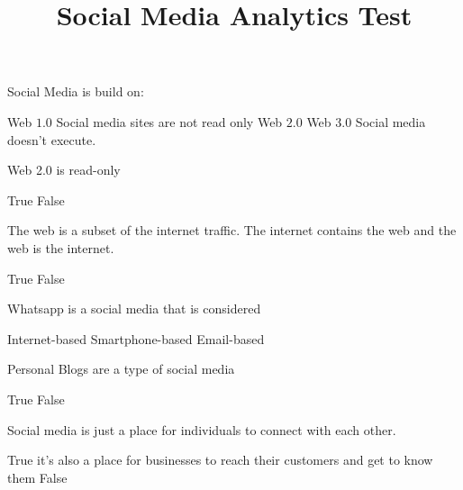 \documentclass[theme=sleek, randomorder, hidesidemenu]{webquiz}
\title{Social Media Analytics Test}
\begin{document}
\begin{question}
  Social Media is build on:
  \begin{choice}[columns=2]
    \incorrect Web $1.0$ %
    \feedback Social media sites are not read only
    \correct Web $2.0$ %
    \incorrect Web $3.0$ %
    \feedback Social media doesn't execute.
  \end{choice}
\end{question}

\begin{question}
  Web 2.0 is read-only
  \begin{choice}[columns=2]
    \incorrect True
    \correct False
  \end{choice}
\end{question}

\begin{question}
  The web is a subset of the internet traffic. The internet contains the web and the web is the internet.
  \begin{choice}[columns=2]
    \incorrect True
    \correct False
  \end{choice}
\end{question}

\begin{question}
  Whatsapp is a social media that is considered
  \begin{choice}[columns=2]
    \incorrect Internet-based
    \correct Smartphone-based
    \incorrect Email-based
  \end{choice}
\end{question}


\begin{question}
  Personal Blogs are a type of social media
  \begin{choice}[columns=2]
    \correct True
    \incorrect False
  \end{choice}
\end{question}

\begin{question}
  Social media is just a place for individuals to connect with each other.
  \begin{choice}[columns=2]
    \incorrect True
    \feedback it's also a place for businesses to reach their customers and get to know them
    \correct False
  \end{choice}
\end{question}
\end{document}
